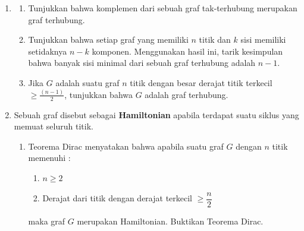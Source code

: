 \documentclass[11pt]{scrartcl}
\begin{document}
\begin{enumerate}
\begin{enumerate}
    \end{enumerate}
    \item 
    \begin{enumerate}
        \item Tunjukkan bahwa komplemen dari sebuah graf tak-terhubung merupakan graf terhubung.
        \item Tunjukkan bahwa setiap graf yang memiliki $n$ titik dan $k$ sisi memiliki setidaknya $n - k$ komponen. Menggunakan hasil ini, tarik kesimpulan bahwa banyak sisi minimal dari sebuah graf terhubung adalah $n - 1$.
        \item Jika $G$ adalah suatu graf $n$ titik dengan besar derajat titik terkecil $\geq \frac{(n-1)}{2}$, tunjukkan bahwa $G$ adalah graf terhubung.
    \end{enumerate}
    \item Sebuah graf disebut sebagai \textbf{Hamiltonian} apabila terdapat suatu siklus yang memuat seluruh titik.
    \begin{enumerate}
        \item Teorema Dirac menyatakan bahwa apabila suatu graf $G$ dengan $n$ titik memenuhi :
        \begin{enumerate}
            \item $n\geq 2$
            \item Derajat dari titik dengan derajat terkecil $\geq \dfrac{n}{2}$ 
        \end{enumerate}
        maka graf $G$ merupakan Hamiltonian. Buktikan Teorema Dirac.
    \end{enumerate}
\end{enumerate}

\newpage
\end{document}
